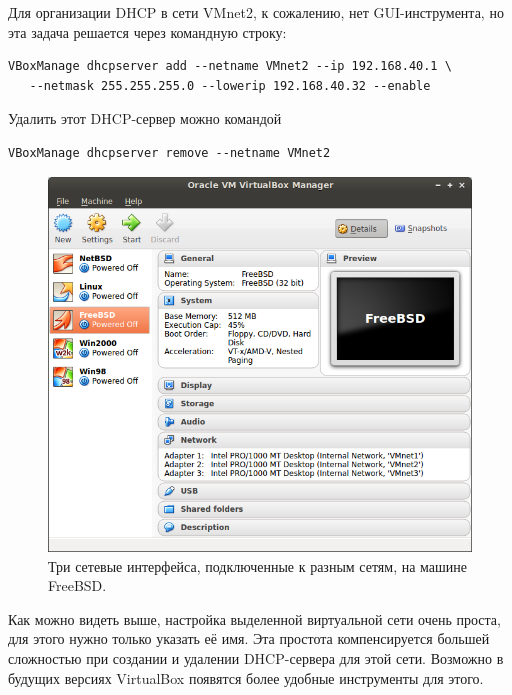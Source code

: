 \documentclass[a4paper, 12pt]{article}		%
\begin{document}
Для организации DHCP в сети VMnet2, к сожалению, нет GUI-инструмента, но эта задача решается через командную строку:

\begin{Verbatim}[frame=single]
VBoxManage dhcpserver add --netname VMnet2 --ip 192.168.40.1 \
   --netmask 255.255.255.0 --lowerip 192.168.40.32 --enable
\end{Verbatim}

Удалить этот DHCP-сервер можно командой

\begin{Verbatim}[frame=single]
VBoxManage dhcpserver remove --netname VMnet2
\end{Verbatim}

\begin{figure}[h!]
\centering
\includegraphics[scale=0.6]{res/freebsd-3net}
\caption{Три сетевые интерфейса, подключенные к разным сетям, на машине FreeBSD.}
\end{figure}

Как можно видеть выше, настройка выделенной виртуальной сети очень проста, для этого нужно только указать её имя. Эта простота компенсируется большей сложностью при создании и удалении DHCP-сервера для этой сети. Возможно в будущих версиях VirtualBox появятся более удобные инструменты для этого.
\end{document}

